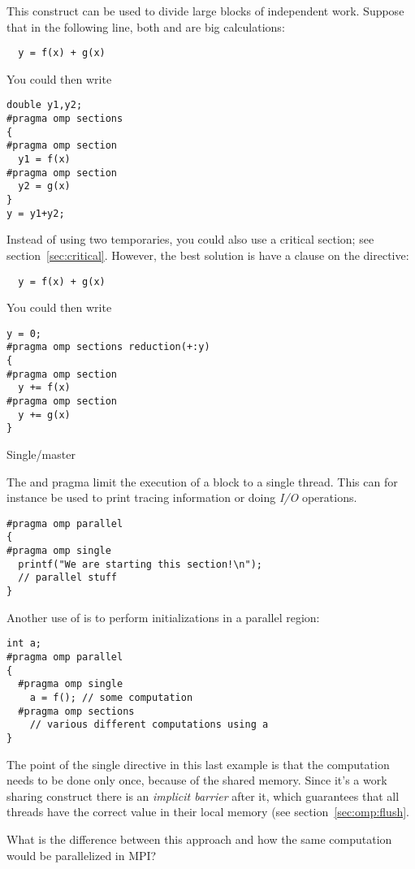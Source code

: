 This construct can be used to divide large blocks of independent work.
Suppose that in the following line, both  and 
are big calculations:
\begin{verbatim}
  y = f(x) + g(x)
\end{verbatim}
You could then write
\begin{verbatim}
double y1,y2;
#pragma omp sections
{
#pragma omp section
  y1 = f(x)
#pragma omp section
  y2 = g(x)
}
y = y1+y2;
\end{verbatim}
Instead of using two temporaries, you could also use a critical
section; see section~\ref{sec:critical}.  However, the best solution
is have a  clause on the  directive:
\begin{verbatim}
  y = f(x) + g(x)
\end{verbatim}
You could then write
\begin{verbatim}
y = 0;
#pragma omp sections reduction(+:y)
{
#pragma omp section
  y += f(x)
#pragma omp section
  y += g(x)
}
\end{verbatim}

 {Single/master}
\label{sec:omp-single}

The  and  pragma
limit the execution of a block to a single thread. 
This can for instance be used to print tracing information
or doing \emph{I/O} operations.
\begin{verbatim}
#pragma omp parallel
{
#pragma omp single
  printf("We are starting this section!\n");
  // parallel stuff
}
\end{verbatim}
Another use of  is to perform initializations
in a parallel region:
\begin{verbatim}
int a;
#pragma omp parallel
{
  #pragma omp single
    a = f(); // some computation
  #pragma omp sections
    // various different computations using a
}
\end{verbatim}

The point of the single directive in this last example is that the
computation needs to be done only once, because of the shared memory.
Since it's a work sharing construct there is an \emph{implicit
  barrier} after it,
which guarantees that all threads have the correct value in their
local memory (see section~\ref{sec:omp:flush}.

\begin{exercise}
  \label{ex:omp-single-mpi}
  What is the difference between this approach and how the same
  computation would be parallelized in MPI?
\end{exercise}

